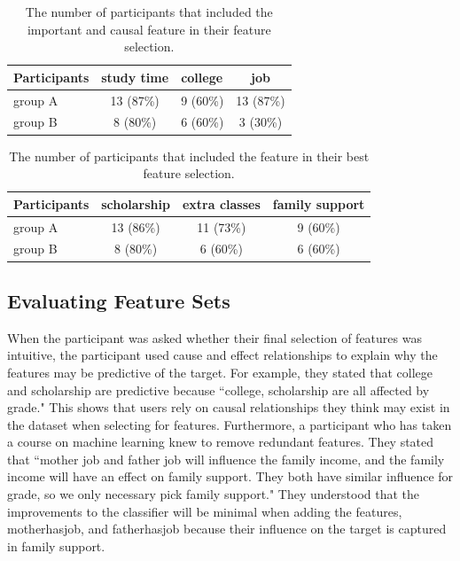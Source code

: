 \begin{table}[]
\centering
\begin{tabular}{lccc}
\hline
Participants & \multicolumn{1}{l}{study time} & \multicolumn{1}{l}{college} & job \\ \hline
group A      & 13 (87\%)                      &  9  (60\%) & 13 (87\%)               \\
group B      & 8 (80\%)                       &  6  (60\%) & 3  (30\%)          \\ \hline
\end{tabular}
\caption{The number of participants that included the important and causal feature in their feature selection.}
\label{RelevantFSBasedOnImportance}
\end{table}

\begin{table}[]
\centering
\begin{tabular}{lccc}
\hline
Participants & \multicolumn{1}{l}{scholarship} & \multicolumn{1}{l}{extra classes} & \multicolumn{1}{l}{family support} \\ \hline
group A      & 13 (86\%)   & 11 (73\%)  & 9 (60\%)  \\
group B      & 8 (80\%)     & 6 (60\%)  & 6 (60\%)  \\ \hline
\end{tabular}
\caption{The number of participants that included the feature in their best feature selection.}
\label{RevelantFSBasedOnCausal}
\end{table}

\subsection{Evaluating Feature Sets}
When the participant was asked whether their final selection of features was intuitive, the participant used cause and effect relationships to explain why the features may be predictive of the target. For example, they stated that college and scholarship are predictive because ``college, scholarship are all affected by grade." This shows that users rely on causal relationships they think may exist in the dataset when selecting for features. Furthermore, a participant who has taken a course on machine learning knew to remove redundant features. They stated that ``mother job and father job will influence the family income, and the family income will have an effect on family support. They both have similar influence for grade, so we only necessary pick family support." They understood that the improvements to the classifier will be minimal when adding the features, motherhasjob, and fatherhasjob because their influence on the target is captured in family support.

